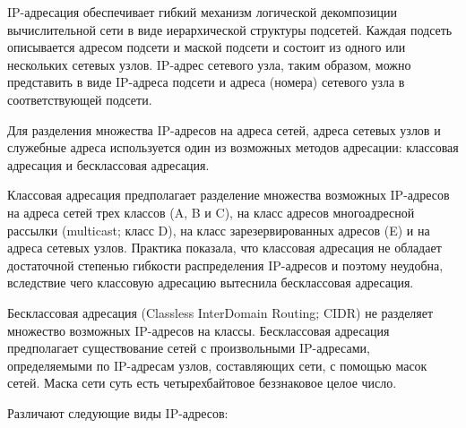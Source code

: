 	IP-адресация обеспечивает гибкий механизм логической декомпозиции вычислительной сети в виде иерархической структуры подсетей.
	Каждая подсеть описывается адресом подсети и маской подсети и состоит из одного или нескольких сетевых узлов. IP-адрес сетевого узла, таким образом, можно
	представить в виде IP-адреса подсети и адреса (номера) сетевого узла в соответствующей подсети.

	Для разделения множества IP-адресов на адреса сетей, адреса сетевых узлов и служебные адреса используется один из возможных методов адресации:
	классовая адресация и бесклассовая адресация.
	
	Классовая адресация предполагает разделение множества возможных IP-адресов на адреса сетей трех классов (A, B и C),
	на класс адресов многоадресной рассылки (multicast; класс D), на класс зарезервированных адресов (E) и на адреса сетевых узлов.
	Практика показала, что классовая адресация не обладает достаточной степенью гибкости распределения IP-адресов и поэтому неудобна,
	вследствие чего классовую адресацию вытеснила бесклассовая адресация.

	Бесклассовая адресация (Classless InterDomain Routing; CIDR) не разделяет множество возможных IP-адресов на классы. Бесклассовая адресация
	предполагает существование сетей с произвольными IP-адресами, определяемыми по IP-адресам узлов, составляющих сети, с помощью масок сетей.
	Маска сети суть есть четырехбайтовое беззнаковое целое число.

	Различают следующие виды IP-адресов:

